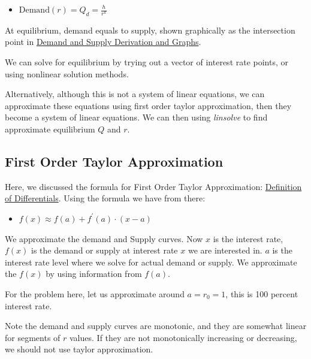 \documentclass[
]{book}
\providecommand{\tightlist}{%
  \setlength{\itemsep}{0pt}\setlength{\parskip}{0pt}}
\begin{document}
\begin{itemize}
\tightlist
\item
  \(\displaystyle \textrm{Demand}(r)=Q_d =\frac{h}{r^k }\)
\end{itemize}

At equilibrium, demand equals to supply, shown graphically as the
intersection point in \href{https://fanwangecon.github.io/Math4Econ/derivative_application/K_borrow_firm.html}{Demand and Supply Derivation and
Graphs}.

We can solve for equilibrium by trying out a vector of interest rate
points, or using nonlinear solution methods.

Alternatively, although this is not a system of linear equations, we can
approximate these equations using first order taylor approximation, then
they become a system of linear equations. We can then using \emph{linsolve}
to find approximate equilibrium \(Q\) and \(r\).

\hypertarget{first-order-taylor-approximation}{%
\subsection{First Order Taylor Approximation}\label{first-order-taylor-approximation}}

Here, we discussed the formula for First Order Taylor Approximation:
\href{https://fanwangecon.github.io/Math4Econ/derivative/derivative_MPL_first_order_taylor_approximation.html}{Definition of
Differentials}.
Using the formula we have from there:

\begin{itemize}
\tightlist
\item
  \(\displaystyle f(x)\approx f(a)+f^{\prime } (a)\cdot (x-a)\)
\end{itemize}

We approximate the demand and Supply curves. Now \(x\) is the interest
rate, \(f(x)\) is the demand or supply at interest rate \(x\) we are
interested in. \(a\) is the interest rate level where we solve for actual
demand or supply. We approximate the \(f(x)\) by using information from
\(f(a)\).

For the problem here, let us approximate around \(a=r_0 =1\), this is 100
percent interest rate.

Note the demand and supply curves are monotonic, and they are somewhat
linear for segments of \(r\) values. If they are not monotonically
increasing or decreasing, we should not use taylor approximation.
\end{document}
